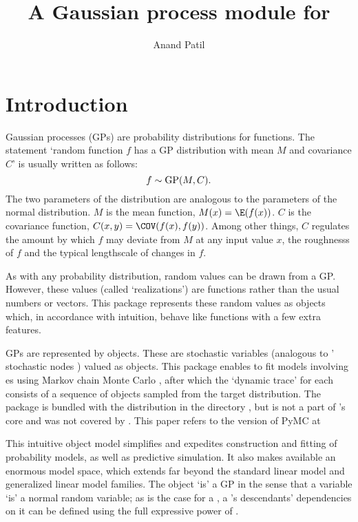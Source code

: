 \documentclass[article]{jss}
\author{Anand Patil}
\title{A Gaussian process module for \pkg{PyMC}}
\begin{document}
\maketitle

\tableofcontents


\section{Introduction}\label{sec:firstlook}

Gaussian processes (GPs) are probability distributions for functions. The statement `random function $f$ has a GP distribution with mean $M$ and covariance $C$' is usually written as follows:
\begin{equation}
    f\sim\textup{GP}(M,C).
\end{equation}
The two parameters of the distribution are analogous to the parameters of the normal distribution. $M$ is the mean function, $M(x)=\E(f(x))$. $C$ is the covariance function, $C(x,y)=\COV(f(x),f(y))$. Among other things, $C$ regulates the amount by which $f$ may deviate from $M$ at any input value $x$, the roughnesss of $f$ and the typical lengthscale of changes in $f$.

As with any probability distribution, random values can be drawn from a GP. However, these values (called `realizations') are functions rather than the usual numbers or vectors. This package represents these random values as  objects which, in accordance with intuition, behave like  functions with a few extra features.

GPs are represented by  objects. These are  stochastic variables \citep{pymc} (analogous to ' stochastic nodes \citep{bugs}) valued as  objects. This package enables  to fit models involving es using Markov chain Monte Carlo \citep{gamerman}, after which the `dynamic trace' for each  consists of a sequence of  objects sampled from the target distribution. The package is bundled with the  distribution in the directory , but is not a part of 's core and was not covered by \cite{pymc}. This paper refers to the version of PyMC at \href{}{} 

This intuitive object model simplifies and expedites construction and fitting of probability models, as well as predictive simulation. It also makes available an enormous model space, which extends far beyond the standard linear model and generalized linear model families. The  object `is' a GP in the sense that a   variable `is' a normal random variable; as is the case for a , a 's descendants' dependencies on it can be defined using the full expressive power of .
\end{document}

